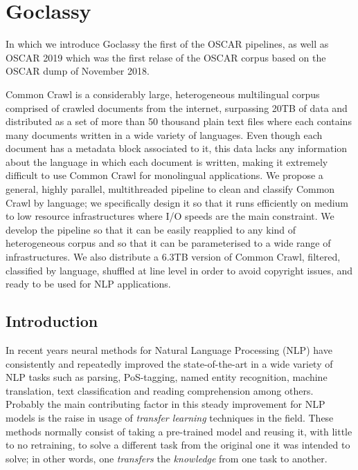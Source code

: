 \chapter{Goclassy}

\begin{center}
    \begin{minipage}{0.5\textwidth}
        \begin{small}
            In which we introduce Goclassy the first of the OSCAR pipelines, as well as OSCAR 2019 which was the first relase of the OSCAR corpus based on the OSCAR dump of November 2018.
        \end{small}
    \end{minipage}
    \vspace{0.5cm}
\end{center}

\noindent Common Crawl is a considerably large, heterogeneous multilingual corpus comprised of crawled documents from the internet, surpassing 20TB of data and distributed as a set of more than 50 thousand plain text files where each contains many documents written in a wide variety of languages. Even though each document has a metadata block associated to it, this data lacks any information about the language in which each document is written, making it extremely difficult to use Common Crawl for monolingual applications. We propose a general, highly parallel, multithreaded pipeline to clean and classify Common Crawl by language; we specifically design it so that it runs efficiently on medium to low resource infrastructures where I/O speeds are the main constraint. We develop the pipeline so that it can be easily reapplied to any kind of  heterogeneous corpus and so that it can be parameterised to a wide range of infrastructures. We also distribute a 6.3TB version of Common Crawl, filtered, classified by language, shuffled at line level in order to avoid copyright issues, and ready to be used for NLP applications.

\section{Introduction}

In recent years neural methods for Natural Language Processing (NLP) have consistently and repeatedly improved the state-of-the-art in a wide variety of NLP tasks such as parsing, PoS-tagging, named entity recognition, machine translation, text classification and reading comprehension among others. Probably the main contributing factor in this steady improvement for NLP models is the raise in usage of \emph{transfer learning} techniques in the field. These methods normally consist of taking a pre-trained model and reusing it, with little to no retraining, to solve a different task from the original one it was intended to solve; in other words, one \emph{transfers} the \emph{knowledge} from one task to another.


